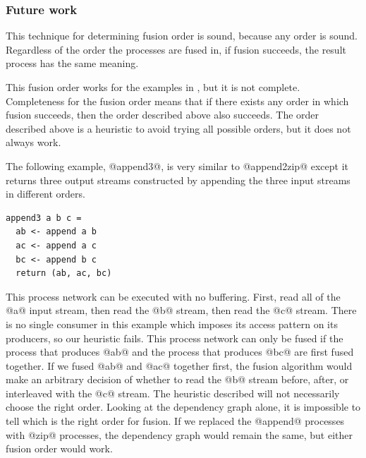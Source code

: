 \subsubsection{Future work}

This technique for determining fusion order is sound, because any order is sound.
Regardless of the order the processes are fused in, if fusion succeeds, the result process has the same meaning.

This fusion order works for the examples in , but it is not complete.
Completeness for the fusion order means that if there exists any order in which fusion succeeds, then the order described above also succeeds.
The order described above is a heuristic to avoid trying all possible orders, but it does not always work.

The following example, @append3@, is very similar to @append2zip@ except it returns three output streams constructed by appending the three input streams in different orders.

\begin{lstlisting}
append3 a b c =
  ab <- append a b
  ac <- append a c
  bc <- append b c
  return (ab, ac, bc)
\end{lstlisting}

This process network can be executed with no buffering.
First, read all of the @a@ input stream, then read the @b@ stream, then read the @c@ stream.
There is no single consumer in this example which imposes its access pattern on its producers, so our heuristic fails.
This process network can only be fused if the process that produces @ab@ and the process that produces @bc@ are first fused together.
If we fused @ab@ and @ac@ together first, the fusion algorithm would make an arbitrary decision of whether to read the @b@ stream before, after, or interleaved with the @c@ stream.
The heuristic described will not necessarily choose the right order.
Looking at the dependency graph alone, it is impossible to tell which is the right order for fusion.
If we replaced the @append@ processes with @zip@ processes, the dependency graph would remain the same, but either fusion order would work.


